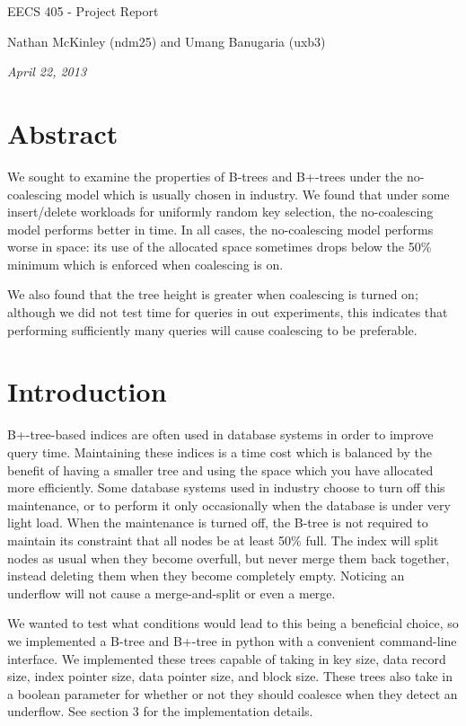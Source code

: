 \documentclass[fleqn]{article}
\begin{document}
\centerline{\sc \large EECS 405 - Project Report}
\vspace{.5pc}
\centerline{\sc Nathan McKinley (ndm25) and Umang Banugaria (uxb3)}
\centerline{\it April 22, 2013}
\vspace{2pc}

\section{Abstract}
We sought to examine the properties of B-trees and B+-trees under the no-coalescing model which is usually chosen in industry.  We found that under some insert/delete workloads for uniformly random key selection, the no-coalescing model performs better in time.  In all cases, the no-coalescing model performs worse in space: its use of the allocated space sometimes drops below the 50\% minimum which is enforced when coalescing is on.

We also found that the tree height is greater when coalescing is turned on; although we did not test time for queries in out experiments, this indicates that performing sufficiently many queries will cause coalescing to be preferable.

\section{Introduction}
B+-tree-based indices are often used in database systems in order to improve query time.  Maintaining these indices is a time cost which is balanced by the benefit of having a smaller tree and using the space which you have allocated more efficiently.  Some database systems used in industry choose to turn off this maintenance, or to perform it only occasionally when the database is under very light load.  When the maintenance is turned off, the B-tree is not required to maintain its constraint that all nodes be at least 50\% full.  The index will split nodes as usual when they become overfull, but never merge them back together, instead deleting them when they become completely empty.  Noticing an underflow will not cause a merge-and-split or even a merge.

We wanted to test what conditions would lead to this being a beneficial choice, so we implemented a B-tree and B+-tree in python with a convenient command-line interface.  We implemented these trees capable of taking in key size, data record size, index pointer size, data pointer size, and block size.  These trees also take in a boolean parameter for whether or not they should coalesce when they detect an underflow.  See section 3 for the implementation details.
\end{document}
